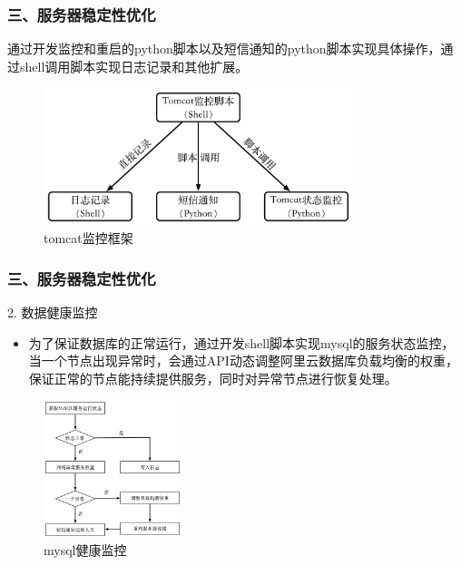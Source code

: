 \documentclass{beamer}
\begin{document}
\begin{frame}
\frametitle{三、服务器稳定性优化}
  通过开发监控和重启的python脚本以及短信通知的python脚本实现具体操作，通过shell调用脚本实现日志记录和其他扩展。
  \begin{figure}
  \centering
    \includegraphics[height=4cm]{./img/03/tomcat2.png}
    \caption{tomcat监控框架}
    \label{fig:tomcat}
  \end{figure}
\end{frame}
\begin{frame}
\frametitle{三、服务器稳定性优化}
  \begin{block}{2. 数据健康监控}
    \begin{itemize}
      \item \footnotesize{为了保证数据库的正常运行，通过开发shell脚本实现mysql的服务状态监控，当一个节点出现异常时，会通过API动态调整阿里云数据库负载均衡的权重，保证正常的节点能持续提供服务，同时对异常节点进行恢复处理。}
    \end{itemize}
  \end{block}
  \begin{figure}
  \centering
    \includegraphics[height=4cm]{./img/03/mysql1.png}
    \caption{mysql健康监控}
    \label{fig:mysql1}
  \end{figure}
\end{frame}
\end{document}
